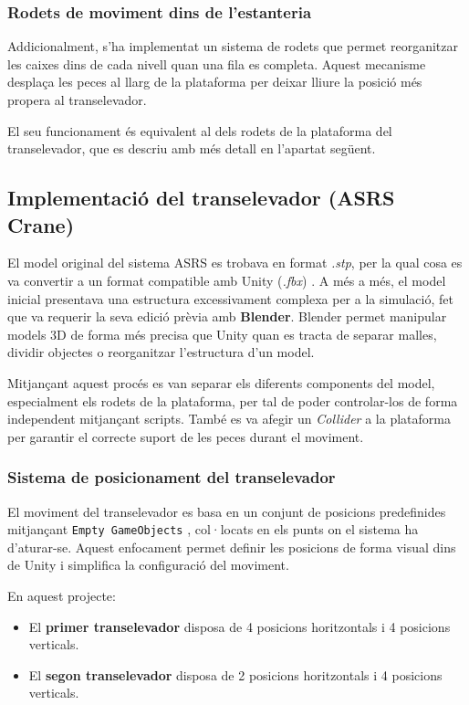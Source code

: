 \documentclass[12pt,a4paper]{report}
\begin{document}
\subsubsection{Rodets de moviment dins de l'estanteria}

Addicionalment, s'ha implementat un sistema de rodets que permet reorganitzar les caixes dins de cada nivell quan una fila es completa. Aquest mecanisme desplaça les peces al llarg de la plataforma per deixar lliure la posició més propera al transelevador.

El seu funcionament és equivalent al dels rodets de la plataforma del transelevador, que es descriu amb més detall en l'apartat següent.

\subsection{Implementació del transelevador (ASRS Crane)}

El model original del sistema ASRS es trobava en format \textit{.stp}, per la qual cosa es va convertir a un format compatible amb Unity (\textit{.fbx}) \cite{stp_to_fbx}. A més a més, el model inicial presentava una estructura excessivament complexa per a la simulació, fet que va requerir la seva edició prèvia amb \textbf{Blender}. Blender permet manipular models 3D de forma més precisa que Unity quan es tracta de separar malles, dividir objectes o reorganitzar l'estructura d'un model.

 Mitjançant aquest procés es van separar els diferents components del model, especialment els rodets de la plataforma, per tal de poder controlar-los de forma independent mitjançant scripts. També es va afegir un \textit{Collider} a la plataforma per garantir el correcte suport de les peces durant el moviment.

\subsubsection{Sistema de posicionament del transelevador}

El moviment del transelevador es basa en un conjunt de posicions predefinides mitjançant \texttt{Empty GameObjects} \cite{UnityGameObjects}, col·locats en els punts on el sistema ha d'aturar-se. Aquest enfocament permet definir les posicions de forma visual dins de Unity i simplifica la configuració del moviment.

En aquest projecte:

\begin{itemize}

\item El \textbf{primer transelevador} disposa de 4 posicions horitzontals i 4 posicions verticals.

\item El \textbf{segon transelevador} disposa de 2 posicions horitzontals i 4 posicions verticals.

\end{itemize}
\end{document}
